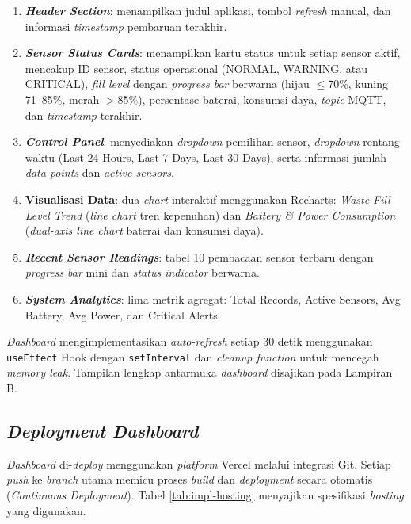\begin{enumerate}
  \item \textbf{\textit{Header Section}}: menampilkan judul aplikasi, tombol \textit{refresh} manual, dan informasi \textit{timestamp} pembaruan terakhir.

  \item \textbf{\textit{Sensor Status Cards}}: menampilkan kartu status untuk setiap sensor aktif, mencakup ID sensor, status operasional (NORMAL, WARNING, atau CRITICAL), \textit{fill level} dengan \textit{progress bar} berwarna (hijau $\leq$70\%, kuning 71--85\%, merah $>$85\%), persentase baterai, konsumsi daya, \textit{topic} MQTT, dan \textit{timestamp} terakhir.

  \item \textbf{\textit{Control Panel}}: menyediakan \textit{dropdown} pemilihan sensor, \textit{dropdown} rentang waktu (Last 24 Hours, Last 7 Days, Last 30 Days), serta informasi jumlah \textit{data points} dan \textit{active sensors}.

  \item \textbf{Visualisasi Data}: dua \textit{chart} interaktif menggunakan Recharts: \textit{Waste Fill Level Trend} (\textit{line chart} tren kepenuhan) dan \textit{Battery \& Power Consumption} (\textit{dual-axis line chart} baterai dan konsumsi daya).

  \item \textbf{\textit{Recent Sensor Readings}}: tabel 10 pembacaan sensor terbaru dengan \textit{progress bar} mini dan \textit{status indicator} berwarna.

  \item \textbf{\textit{System Analytics}}: lima metrik agregat: Total Records, Active Sensors, Avg Battery, Avg Power, dan Critical Alerts.
\end{enumerate}

\textit{Dashboard} mengimplementasikan \textit{auto-refresh} setiap 30 detik menggunakan \texttt{useEffect} Hook dengan \texttt{setInterval} dan \textit{cleanup function} untuk mencegah \textit{memory leak}. Tampilan lengkap antarmuka \textit{dashboard} disajikan pada Lampiran B.

\subsection{\textit{Deployment Dashboard}}

\textit{Dashboard} di-\textit{deploy} menggunakan \textit{platform} Vercel melalui integrasi Git. Setiap \textit{push} ke \textit{branch} utama memicu proses \textit{build} dan \textit{deployment} secara otomatis (\textit{Continuous Deployment}). Tabel \ref{tab:impl-hosting} menyajikan spesifikasi \textit{hosting} yang digunakan.

